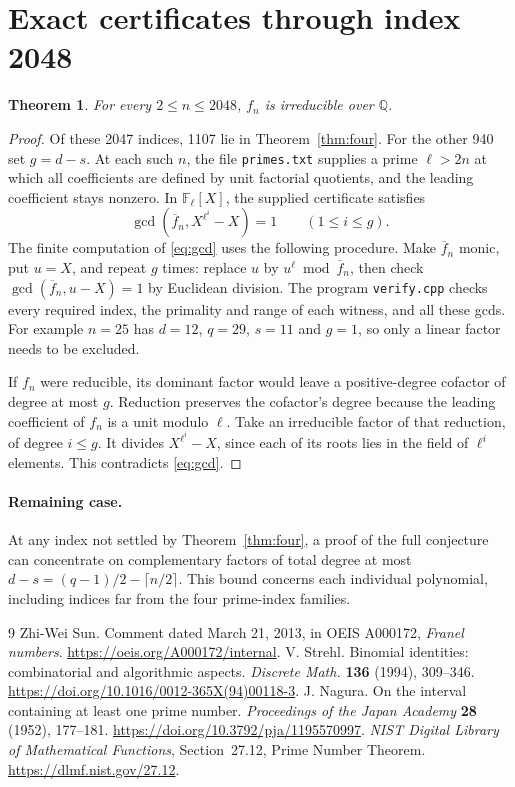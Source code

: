 \documentclass[10pt]{article}
\newtheorem{theorem}{Theorem}
\newcommand{\Q}{\mathbb Q}
\newcommand{\F}{\mathbb F}
\begin{document}
\section{Exact certificates through index 2048}
\begin{theorem}
For every $2\le n\le2048$, $f_n$ is irreducible over $\Q$.
\end{theorem}
\begin{proof}
Of these 2047 indices, 1107 lie in Theorem~\ref{thm:four}. For the other 940 set $g=d-s$. At each such $n$, the file \texttt{primes.txt} supplies a prime $\ell>2n$ at which all coefficients are defined by unit factorial quotients, and the leading coefficient stays nonzero. In $\F_\ell[X]$, the supplied certificate satisfies
\begin{equation}\label{eq:gcd}
 \gcd(\overline f_n,X^{\ell^i}-X)=1\qquad (1\le i\le g).
\end{equation}
The finite computation of \eqref{eq:gcd} uses the following procedure. Make $\overline f_n$ monic, put $u=X$, and repeat $g$ times: replace $u$ by $u^\ell\bmod\overline f_n$, then check $\gcd(\overline f_n,u-X)=1$ by Euclidean division. The program \texttt{verify.cpp} checks every required index, the primality and range of each witness, and all these gcds. For example $n=25$ has $d=12$, $q=29$, $s=11$ and $g=1$, so only a linear factor needs to be excluded.

If $f_n$ were reducible, its dominant factor would leave a positive-degree cofactor of degree at most $g$. Reduction preserves the cofactor's degree because the leading coefficient of $f_n$ is a unit modulo $\ell$. Take an irreducible factor of that reduction, of degree $i\le g$. It divides $X^{\ell^i}-X$, since each of its roots lies in the field of $\ell^i$ elements. This contradicts \eqref{eq:gcd}.
\end{proof}

\paragraph{Remaining case.} At any index not settled by Theorem~\ref{thm:four}, a proof of the full conjecture can concentrate on complementary factors of total degree at most $d-s=(q-1)/2-\lceil n/2\rceil$. This bound concerns each individual polynomial, including indices far from the four prime-index families.

\begin{thebibliography}{9}
 Zhi-Wei Sun. Comment dated March 21, 2013, in OEIS A000172, \emph{Franel numbers}. \url{https://oeis.org/A000172/internal}.
 V. Strehl. Binomial identities: combinatorial and algorithmic aspects. \emph{Discrete Math.} \textbf{136} (1994), 309--346. \url{https://doi.org/10.1016/0012-365X(94)00118-3}.
 J. Nagura. On the interval containing at least one prime number. \emph{Proceedings of the Japan Academy} \textbf{28} (1952), 177--181. \url{https://doi.org/10.3792/pja/1195570997}.
 \emph{NIST Digital Library of Mathematical Functions}, Section~27.12, Prime Number Theorem. \url{https://dlmf.nist.gov/27.12}.
\end{thebibliography}
\end{document}
